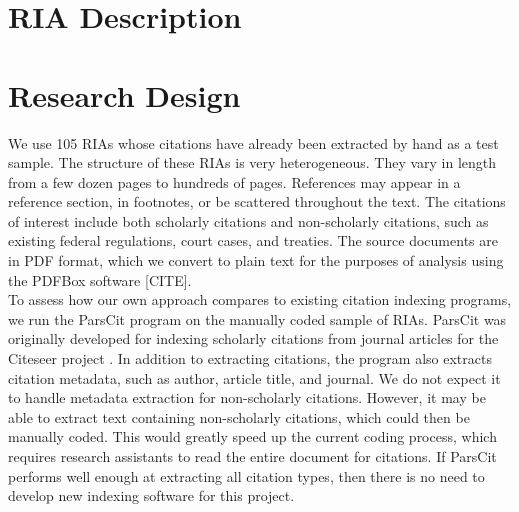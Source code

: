 \documentclass[12pt]{article}
\begin{document}
\section{RIA Description}

\section{Research Design}
We use 105 RIAs whose citations have already been extracted by hand as a test sample. The structure of these RIAs is very heterogeneous. They vary in length from a few dozen pages to hundreds of pages. References may appear in a reference section, in footnotes, or be scattered throughout the text. The citations of interest include both scholarly citations and non-scholarly citations, such as existing federal regulations, court cases, and treaties. The source documents are in PDF format, which we convert to plain text for the purposes of analysis using the PDFBox software [CITE].\\ 

To assess how our own approach compares to existing citation indexing programs, we run the ParsCit program on the manually coded sample of RIAs. ParsCit was originally developed for indexing scholarly citations from journal articles for the Citeseer project \cite{councilletal2008}. In addition to extracting citations, the program also extracts citation metadata, such as author, article title, and journal. We do not expect it to handle metadata extraction for non-scholarly citations. However, it may be able to extract text containing non-scholarly citations, which could then be manually coded. This would greatly speed up the current coding process, which requires research assistants to read the entire document for citations. If ParsCit performs well enough at extracting all citation types, then there is no need to develop new indexing software for this project.\\
\end{document}
